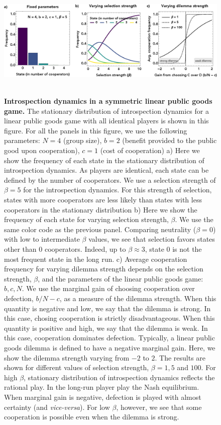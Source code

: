 \documentclass[11pt]{article}
\theoremstyle{plainCl1}
\theoremstyle{plainCl2}
\begin{document}
\begin{figure}
\centering
\includegraphics[width =  \textwidth]{figures/figure1.eps}~\\[0.4cm]
\caption{\onehalfspacing
\textbf{Introspection dynamics in a symmetric linear public goods game.}
The stationary distribution of introspection dynamics for a linear public goods game with all identical players is shown in this figure. For all the panels in this figure, we use the following parameters: $N = 4$ (group size), $b = 2$ (benefit provided to the public good upon cooperation), $c = 1$ (cost of cooperation) a) Here we show the frequency of each state in the stationary distribution of introspection dynamics. As players are identical, each state can be defined by the number of cooperators. We use a selection strength of $\beta = 5$ for the introspection dynamics. For this strength of selection, states with more cooperators are less likely than states with less cooperators in the stationary distribution b) Here we show the frequency of each state for varying selection strength, $\beta$. We use the same color code as the previous panel. Comparing neutrality ($\beta = 0$) with low to intermediate $\beta$ values, we see that selection favors states other than 0 cooperators. Indeed, up to $\beta \approx 3$, state $0$ is not the most frequent state in the long run. c) Average cooperation frequency for varying dilemma strength depends on the selection strength, $\beta$, and the parameters of the linear public goods game: $b,c, N$. We use the marginal gain of choosing cooperation over defection, $b/N - c$, as a measure of the dilemma strength. When this quantity is negative and low, we say that the dilemma is strong. In this case, chosing cooperation is strictly disadvantageous. When this quantity is positive and high, we say that the dilemma is weak. In this case, cooperation dominates defection. Typically, a linear public goods dilemma is defined to have a negative marginal gain. Here, we show the dilemma strength varying from $-2$ to $2$. The results are shown for different values of selection strength, $\beta = 1, 5$ and $100$. For high $\beta$, stationary distribution of introspection dynamics reflects the rational play. In the long-run player play the Nash equilibrium. When marginal gain is negative, defection is played with almost certainty (and \emph{vice-versa}). For low $\beta$, however, we see that some cooperation is possible even when the dilemma is strong. }
\label{Fig:LPGG-symmetric}
\end{figure}
\end{document}
